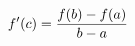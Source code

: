 \documentclass[preview]{standalone}
\begin{document}
\begin{align*}
\special{dvisvgm:raw <g id='unique000'>}f'(c) = \frac{f(b) - f(a)}{b - a}\special{dvisvgm:raw </g>}
\end{align*}
\end{document}
